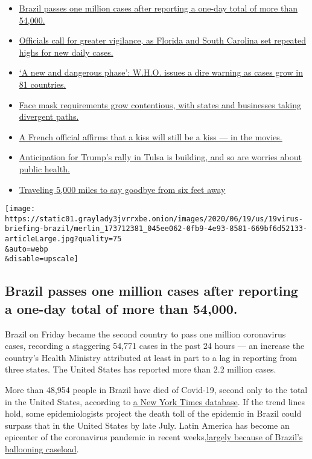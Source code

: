 \begin{itemize}
\tightlist
\item
  \protect\hyperlink{link-165a4135}{Brazil passes one million cases
  after reporting a one-day total of more than 54,000.}
\item
  \protect\hyperlink{link-510cd1a4}{Officials call for greater
  vigilance, as Florida and South Carolina set repeated highs for new
  daily cases.}
\item
  \protect\hyperlink{link-6db5071b}{`A new and dangerous phase': W.H.O.
  issues a dire warning as cases grow in 81 countries.}
\item
  \protect\hyperlink{link-29c5ce02}{Face mask requirements grow
  contentious, with states and businesses taking divergent paths.}
\item
  \protect\hyperlink{link-2748bcc4}{A French official affirms that a
  kiss will still be a kiss --- in the movies.}
\item
  \protect\hyperlink{link-bfd0690}{Anticipation for Trump's rally in
  Tulsa is building, and so are worries about public health.}
\item
  \protect\hyperlink{link-44a77124}{Traveling 5,000 miles to say goodbye
  from six feet away}
\end{itemize}

\texttt{[image: https://static01.graylady3jvrrxbe.onion/images/2020/06/19/us/19virus-briefing-brazil/merlin\_173712381\_045ee062-0fb9-4e93-8581-669bf6d52133-articleLarge.jpg?quality=75\\\&auto=webp\\\&disable=upscale]}

\hypertarget{brazil-passes-one-million-cases-after-reporting-a-one-day-total-of-more-than-54000}{%
\subsection{Brazil passes one million cases after reporting a one-day
total of more than
54,000.}\label{brazil-passes-one-million-cases-after-reporting-a-one-day-total-of-more-than-54000}}

Brazil on Friday became the second country to pass one million
coronavirus cases, recording a staggering 54,771 cases in the past 24
hours --- an increase the country's Health Ministry attributed at least
in part to a lag in reporting from three states. The United States has
reported more than 2.2 million cases.

More than 48,954 people in Brazil have died of Covid-19, second only to
the total in the United States, according to
\href{https://www.nytimes3xbfgragh.onion/interactive/2020/world/americas/brazil-coronavirus-cases.html}{a
New York Times database}. If the trend lines hold, some epidemiologists
project the death toll of the epidemic in Brazil could surpass that in
the United States by late July. Latin America has become an epicenter of
the coronavirus pandemic in recent
weeks,\href{https://www.nytimes3xbfgragh.onion/article/brazil-coronavirus-cases.html}{largely
because of Brazil's ballooning caseload}.

